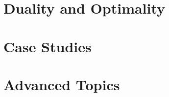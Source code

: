\documentclass[oneside]{gsm-l} %
\numberwithin{section}{chapter}
\numberwithin{equation}{chapter}
\numberwithin{figure}{chapter}
\begin{document}
\part{Duality and Optimality}






\part{Case Studies}




\part{Advanced Topics}



\appendix




\backmatter
{\RaggedRight

}


\printindex
\end{document}
